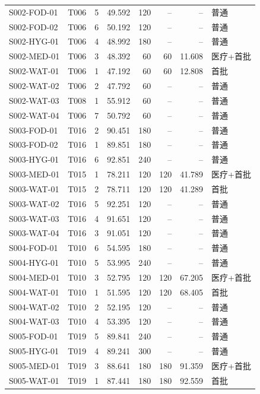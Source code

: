 \begin{longtable}{@{}llrrrrrl@{}}
S002-FOD-01 & T006 & 5 & 49.592 & 120 & -- & -- & 普通 \\
S002-FOD-02 & T006 & 6 & 50.192 & 120 & -- & -- & 普通 \\
S002-HYG-01 & T006 & 4 & 48.992 & 180 & -- & -- & 普通 \\
S002-MED-01 & T006 & 3 & 48.392 & 60 & 60 & 11.608 & 医疗+首批 \\
S002-WAT-01 & T006 & 1 & 47.192 & 60 & 60 & 12.808 & 首批 \\
S002-WAT-02 & T006 & 2 & 47.792 & 60 & -- & -- & 普通 \\
S002-WAT-03 & T008 & 1 & 55.912 & 60 & -- & -- & 普通 \\
S002-WAT-04 & T006 & 7 & 50.792 & 60 & -- & -- & 普通 \\
S003-FOD-01 & T016 & 2 & 90.451 & 180 & -- & -- & 普通 \\
S003-FOD-02 & T016 & 1 & 89.851 & 180 & -- & -- & 普通 \\
S003-HYG-01 & T016 & 6 & 92.851 & 240 & -- & -- & 普通 \\
S003-MED-01 & T015 & 1 & 78.211 & 120 & 120 & 41.789 & 医疗+首批 \\
S003-WAT-01 & T015 & 2 & 78.711 & 120 & 120 & 41.289 & 首批 \\
S003-WAT-02 & T016 & 5 & 92.251 & 120 & -- & -- & 普通 \\
S003-WAT-03 & T016 & 4 & 91.651 & 120 & -- & -- & 普通 \\
S003-WAT-04 & T016 & 3 & 91.051 & 120 & -- & -- & 普通 \\
S004-FOD-01 & T010 & 6 & 54.595 & 180 & -- & -- & 普通 \\
S004-HYG-01 & T010 & 5 & 53.995 & 240 & -- & -- & 普通 \\
S004-MED-01 & T010 & 3 & 52.795 & 120 & 120 & 67.205 & 医疗+首批 \\
S004-WAT-01 & T010 & 1 & 51.595 & 120 & 120 & 68.405 & 首批 \\
S004-WAT-02 & T010 & 2 & 52.195 & 120 & -- & -- & 普通 \\
S004-WAT-03 & T010 & 4 & 53.395 & 120 & -- & -- & 普通 \\
S005-FOD-01 & T019 & 5 & 89.841 & 240 & -- & -- & 普通 \\
S005-HYG-01 & T019 & 4 & 89.241 & 300 & -- & -- & 普通 \\
S005-MED-01 & T019 & 3 & 88.641 & 180 & 180 & 91.359 & 医疗+首批 \\
S005-WAT-01 & T019 & 1 & 87.441 & 180 & 180 & 92.559 & 首批 \\

\end{longtable}
